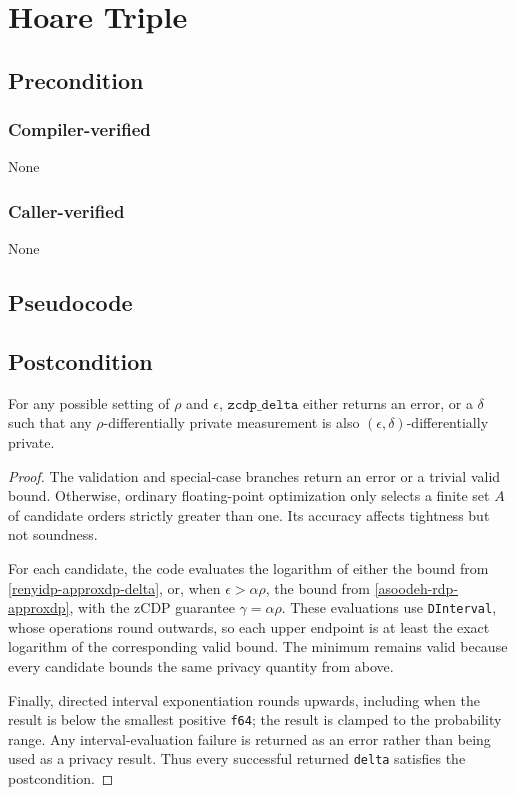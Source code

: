 \documentclass{article}
\begin{document}
\section{Hoare Triple}
\subsection*{Precondition}
\subsubsection*{Compiler-verified}
None

\subsubsection*{Caller-verified}
None

\subsection*{Pseudocode}



\subsection*{Postcondition}

\begin{theorem}
    For any possible setting of $\rho$ and $\epsilon$, $\texttt{zcdp\_delta}$ either returns an error,
    or a $\delta$ such that any $\rho$-differentially private measurement is also $(\epsilon, \delta)$-differentially private.
\end{theorem}
\begin{proof}
The validation and special-case branches return an error or a trivial valid
bound. Otherwise, ordinary floating-point optimization only selects a finite
set $A$ of candidate orders strictly greater than one. Its accuracy affects
tightness but not soundness.

For each candidate, the code evaluates the logarithm of either the bound from
\ref{renyidp-approxdp-delta}, or, when $\epsilon>\alpha\rho$, the bound from
\ref{asoodeh-rdp-approxdp}, with the zCDP guarantee
$\gamma=\alpha\rho$. These evaluations use \texttt{DInterval}, whose
operations round outwards, so each upper endpoint is at least the exact
logarithm of the corresponding valid bound. The minimum remains valid because
every candidate bounds the same privacy quantity from above.

Finally, directed interval exponentiation rounds upwards, including when the
result is below the smallest positive \texttt{f64}; the result is clamped to
the probability range. Any interval-evaluation failure is returned as an
error rather than being used as a privacy result. Thus every successful
returned \texttt{delta} satisfies the postcondition.
\end{proof}




\end{document}
